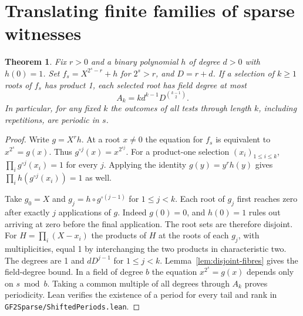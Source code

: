 \documentclass[11pt]{article}
\newtheorem{theorem}{Theorem}
\begin{document}
\section{Translating finite families of sparse witnesses}
\begin{theorem}\label{thm:tail-transfer}
Fix \(r>0\) and a binary polynomial \(h\) of degree \(d>0\) with
\(h(0)=1\). Set \(f_s=X^{2^s-r}+h\) for \(2^s>r\), and \(D=r+d\).
If a selection of \(k\ge1\) roots of \(f_s\) has product 1, each
selected root has field degree at most
\[
                      A_k=k d^{k-1}D^{\binom{k-1}{2}}.
\]
In particular, for any fixed \(k\) the outcomes of all tests through
length \(k\), including repetitions, are periodic in \(s\).
\end{theorem}
\begin{proof}
Write \(g=X^r h\). At a root \(x\ne0\) the equation for \(f_s\)
is equivalent to \(x^{2^s}=g(x)\). Thus \(g^{\circ j}(x)=x^{2^{sj}}\).
For a product-one selection \((x_i)_{1\le i\le k}\),
\(\prod_i g^{\circ j}(x_i)=1\) for every \(j\).
Applying the identity \(g(y)=y^r h(y)\) gives
\(\prod_i h(g^{\circ j}(x_i))=1\) as well.

Take \(g_0=X\) and \(g_j=h\circ g^{\circ(j-1)}\) for \(1\le j<k\).
Each root of \(g_j\) first reaches zero after exactly \(j\) applications
of \(g\). Indeed \(g(0)=0\), and \(h(0)=1\) rules out arriving at
zero before the final application. The root sets are therefore disjoint.
For \(H=\prod_i(X-x_i)\) the products of \(H\) at the roots of
each \(g_j\), with multiplicities, equal 1 by interchanging the two
products in characteristic two. The degrees are 1 and
\(d D^{j-1}\) for \(1\le j<k\).
Lemma~\ref{lem:disjoint-fibres} gives the field-degree bound.
In a field of degree \(b\) the equation \(x^{2^s}=g(x)\) depends only
on \(s\bmod b\). Taking a common multiple of all degrees through
\(A_k\) proves periodicity. Lean verifies the existence of a period
for every tail and rank in \nolinkurl{GF2Sparse/ShiftedPeriods.lean}.
\end{proof}
\end{document}
